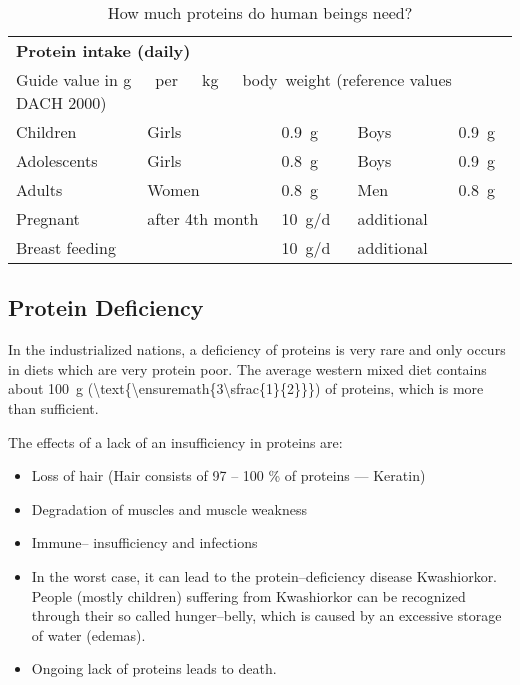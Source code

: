 \documentclass[../main.tex]{subfiles}
\begin{document}
  \begin{table}[htb!]
    \centering
    \begin{tabular}{lllll}
      \multicolumn{5}{l}{\textbf{Protein intake (daily)}} \\
      \multicolumn{5}{l}{Guide value in \unit{\g\ per\ \kg\ body weight} (reference values DACH 2000)}\\
      \hline
      Children & Girls & \SI{0.9}{\g} & Boys & \SI{0.9}{\g} \\
      Adolescents & Girls & \SI{0.8}{\g} & Boys & \SI{0.9}{\g} \\
      Adults & Women & \SI{0.8}{\g} & Men & \SI{0.8}{\g} \\
      Pregnant & after 4th month & \SI{10}{\g/\day} & additional \\
      Breast feeding &  & \SI{10}{\g/\day} & additional \\ 
    \end{tabular}
    \caption{How much proteins do human beings need?}
  \end{table}

  \subsection{Protein Deficiency}

  In the industrialized nations, a deficiency of proteins is very rare and only occurs in diets which are very protein poor.
  The average western mixed diet contains about \SI{100}{\g}
  (\SI[parse-numbers=false]{\text{\ensuremath{3\sfrac{1}{2}}}}{\oz}) of proteins, which is more than sufficient.

  The effects of a lack of an insufficiency in proteins are:
  \begin{itemize}
  \item Loss of hair (Hair consists of 97 -- 100 \% of proteins --- Keratin)
  \item Degradation of muscles and muscle weakness
  \item Immune-- insufficiency and infections
  \item In the worst case, it can lead to the protein--deficiency disease Kwashiorkor.
    People (mostly children) suffering from Kwashiorkor can be recognized through their so called hunger--belly,
    which is caused by an excessive storage of water (edemas).
    \item Ongoing lack of proteins leads to death.
  \end{itemize}
\end{document}
